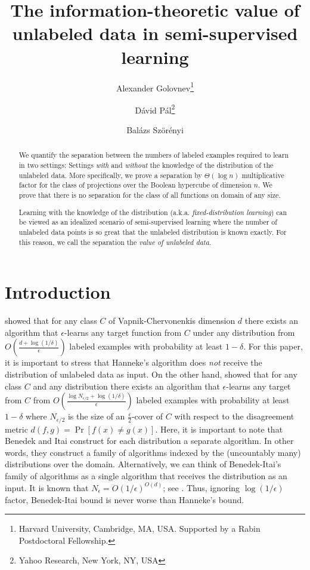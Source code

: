\documentclass[11pt]{article}
\begin{document}
\title{The information-theoretic value of unlabeled data in semi-supervised learning}
\author{Alexander Golovnev\thanks{Harvard University, Cambridge, MA, USA. Supported by a Rabin Postdoctoral Fellowship.} \and D\'avid P\'al\thanks{Yahoo Research, New York, NY, USA} \and Bal\'azs Sz\"or\'enyi\footnotemark[2]}

\maketitle


\begin{abstract}
We quantify the separation between the numbers of labeled examples required to
learn in two settings: Settings \emph{with} and \emph{without} the knowledge of
the distribution of the unlabeled data. More specifically, we prove a separation
by $\Theta(\log n)$ multiplicative factor for the class of projections over
the Boolean hypercube of dimension $n$. We prove that there is no separation
for the class of all functions on domain of any size.

Learning with the knowledge of the distribution (a.k.a. \emph{fixed-distribution
learning}) can be viewed as an idealized scenario of semi-supervised learning
where the number of unlabeled data points is so great that the unlabeled
distribution is known exactly. For this reason, we call the separation the
\emph{value of unlabeled data}.
\end{abstract}



\section{Introduction}
\label{section:introduction}

\citet{Hanneke-2016} showed that for any class $C$ of Vapnik-Chervonenkis
dimension $d$ there exists an algorithm that $\epsilon$-learns any target
function from $C$ under any distribution from $O\left(\frac{d +
\log(1/\delta)}{\epsilon}\right)$ labeled examples with probability at least
$1-\delta$. For this paper, it is important to stress that Hanneke's algorithm
does \emph{not} receive the distribution of unlabeled data as input. On the
other hand, \citet{Benedek-Itai-1991} showed that for any class $C$ and any
distribution there exists an algorithm that $\epsilon$-learns any target from
$C$ from $O \left( \frac{\log N_{\epsilon/2} + \log
(1/\delta)}{\epsilon}\right)$ labeled examples with probability at least
$1-\delta$ where $N_{\epsilon/2}$ is the size of an $\frac{\epsilon}{2}$-cover
of $C$ with respect to the disagreement metric $d(f,g) = \Pr[f(x) \neq g(x)]$.
Here, it is important to note that Benedek and Itai construct for each
distribution a separate algorithm. In other words, they construct a family of
algorithms indexed by the (uncountably many) distributions over the domain.
Alternatively, we can think of Benedek-Itai's family of algorithms as a single
algorithm that receives the distribution as an input. It is known that
$N_\epsilon = O(1/\epsilon)^{O(d)}$; see \citet{Dudley-1978}. Thus, ignoring
$\log(1/\epsilon)$ factor, Benedek-Itai bound is never worse than Hanneke's
bound.
\end{document}
